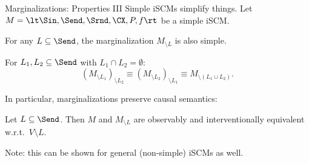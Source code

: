 \begin{frame}{Marginalizations: Properties III}
Simple iSCMs simplify things.
Let $M = \lt \Sin, \Send, \Srnd, \CX, P, f \rt$ be a simple iSCM.

  \begin{Prp}[\ref{prp:marginalization_preserves_simplicity}]
    For any $L \subseteq \Send$, the marginalization $M_{\setminus L}$ is also simple.
  \end{Prp}

  \begin{Cor}[\ref{cor:marginalization_commutes_simple_scm}]
    For $L_1, L_2 \subseteq \Send$ with $L_1 \cap L_2 = \emptyset$:
    $$(M_{\setminus L_1})_{\setminus L_2} \equiv (M_{\setminus L_2})_{\setminus L_1} \equiv M_{\setminus (L_1 \cup L_2)}.$$
  \end{Cor}
 
  In particular, marginalizations preserve causal semantics:
  \begin{Thm}[\ref{thm:various_equiv_marginalization}]
     Let $L \subseteq \Send$.
  Then $M$ and $M_{\setminus L}$ are observably and
  interventionally %
  equivalent w.r.t.\ $V \setminus L$.
  \end{Thm}

Note: this can be shown for general (non-simple) iSCMs as well.
\end{frame}


